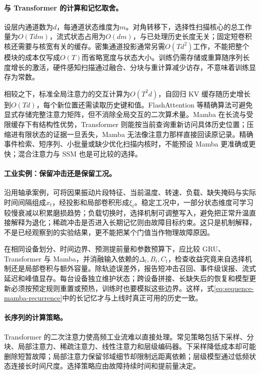 \paragraph{与 Transformer 的计算和记忆取舍。}
设层内通道数为$d$，每通道状态维度为$m$。对角转移下，选择性扫描核心的总工作量为$O(Tdm)$，流式状态占用为$O(dm)$，与已处理历史长度无关；固定短卷积核还需要与核宽有关的缓存。密集通道投影通常另需$O(Td^2)$工作，不能把整个模块的成本仅写成$O(T)$而省略宽度与状态大小。训练仍需存储或重算随序列长度增长的激活，硬件感知扫描通过融合、分块与重计算减少访存，不意味着训练显存为常数。

相较之下，标准全局注意力的交互计算为$O(T^2d)$，自回归 KV 缓存随历史增长到$O(Td)$，每个新位置还需读取历史键和值。FlashAttention 等精确算法可避免显式存储完整注意力矩阵，但不消除全局交互的二次算术量。Mamba 在长流与受限缓存下有结构性优势，Transformer 则能按当前查询重新访问具体历史位置；压缩进有限状态的证据一旦丢失，Mamba 无法像注意力那样直接回读原记录。精确事件检索、短序列、小批量或缺少优化扫描内核时，不能预设 Mamba 更准确或更快；混合注意力与 SSM 也是可比较的选择。

\paragraph{工业实例：保留冲击还是保留工况。}
沿用轴承案例，可将因果振动片段特征、当前温度、转速、负载、缺失掩码与实际时间间隔组成$x_t$，经投影和局部卷积形成$\xi_t$。稳定工况中，一部分状态维度可学习较慢衰减以积累磨损趋势；负载切换时，选择机制可调整写入，避免把正常升温直接解释为退化；稀疏冲击是否进入长期记忆则由故障目标约束。这只是机制解释，不是已经观察到的实验结果，更不能把某个门值当作物理故障原因。

在相同设备划分、时间边界、预测提前量和参数预算下，应比较 GRU、Transformer 与 Mamba，并消融输入依赖的$\Delta_t,B_t,C_t$，检查收益究竟来自选择机制还是局部卷积与额外容量。除轨迹误差外，报告短冲击召回、事件级误报、流式延迟和峰值显存。每台设备独立维护状态；跨设备拼接、长缺失后的恢复和模型更新必须按预定规则重置或预热，训练时也要模拟这些边界。这样，式\eqref{eq:sequence-mamba-recurrence}中的长记忆才与上线时真正可用的历史一致。

\paragraph{长序列的计算策略。}
Transformer 的二次注意力使高频工业流难以直接处理。常见策略包括下采样、分块、局部注意力、稀疏注意力、线性注意力和层级编码器。下采样降低成本却可能删除短暂故障；局部注意力保留邻域细节却限制远距离依赖；层级模型通过低频状态连接长时间尺度。选择策略应由故障持续时间和提前量决定。

